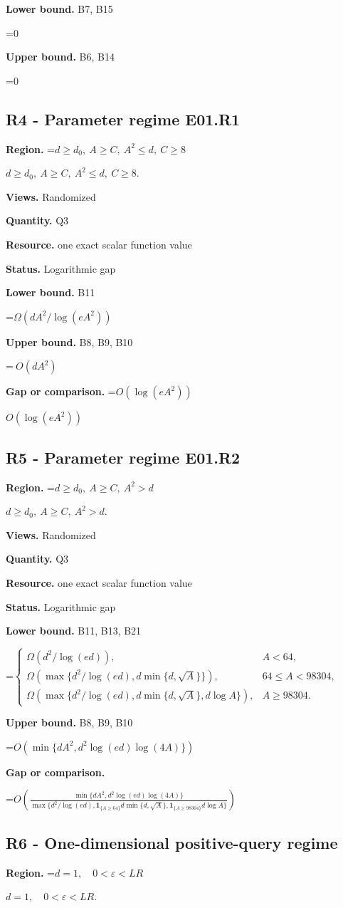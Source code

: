 \documentclass[10pt,a4paper]{article}
\newcommand{\AtlasMath}[1]{\par\begingroup\centering\setbox0=\hbox{$\displaystyle #1$}\ifdim\wd0>1.4\linewidth\typeout{ATLAS WIDE FORMULA: \the\wd0}\fi\ifdim\wd0>\linewidth\resizebox{\linewidth}{!}{\box0}\else\box0\fi\par\endgroup}
\newcommand{\AtlasInlineMath}[1]{\begingroup\setbox0=\hbox{$#1$}\ifdim\wd0>.4\linewidth\endgroup\AtlasMath{#1}\else\endgroup$#1$\fi}
\begin{document}
\textbf{Lower bound.} B7, B15

\AtlasMath{0}
\textbf{Upper bound.} B6, B14

\AtlasMath{0}
\subsection{R4 - Parameter regime E01.R1}
\textbf{Region.} \AtlasInlineMath{d\ge d_0,\ A\ge C,\ A^2\le d,\ C\ge8}.

\textbf{Views.} Randomized

\textbf{Quantity.} Q3

\textbf{Resource.} one exact scalar function value

\textbf{Status.} Logarithmic gap

\textbf{Lower bound.} B11

\AtlasMath{\Omega(dA^2/\log(eA^2))}
\textbf{Upper bound.} B8, B9, B10

\AtlasMath{\ O(dA^2)}
\textbf{Gap or comparison.} \AtlasInlineMath{O(\log(eA^2))}

\subsection{R5 - Parameter regime E01.R2}
\textbf{Region.} \AtlasInlineMath{d\ge d_0,\ A\ge C,\ A^2>d}.

\textbf{Views.} Randomized

\textbf{Quantity.} Q3

\textbf{Resource.} one exact scalar function value

\textbf{Status.} Logarithmic gap

\textbf{Lower bound.} B11, B13, B21

\AtlasMath{\begin{cases}\Omega(d^2/\log(ed)),&A<64,\\\Omega(\max\{d^2/\log(ed),d\min\{d,\sqrt A\}\}),&64\le A<98304,\\\Omega(\max\{d^2/\log(ed),d\min\{d,\sqrt A\},d\log A\}),&A\ge98304.\end{cases}}
\textbf{Upper bound.} B8, B9, B10

\AtlasMath{O(\min\{dA^2,d^2\log(ed)\log(4A)\})}
\textbf{Gap or comparison.} 
\AtlasMath{O\!\left(\frac{\min\{dA^2,d^2\log(ed)\log(4A)\}}{\max\{d^2/\log(ed),\mathbf{1}_{\{A\ge64\}}d\min\{d,\sqrt A\},\mathbf{1}_{\{A\ge98304\}}d\log A\}}\right)}


\subsection{R6 - One-dimensional positive-query regime}
\textbf{Region.} \AtlasInlineMath{d=1,\quad 0<\varepsilon<LR}.
\end{document}

